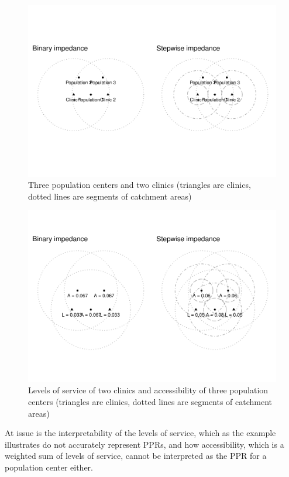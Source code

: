 \documentclass[10pt,letterpaper]{article}
\begin{document}
\begin{figure}
\includegraphics[width=0.95\linewidth]{Supply_and_Demand_Inflation_in_FCA_Methods_v2.0_files/figure-latex/fig3-example-3-1} \caption{\label{fig:fig3-example-3}Three population centers and two clinics (triangles are clinics, dotted lines are segments of catchment areas)}\label{fig:fig3-example-3}
\end{figure}

\begin{figure}
\includegraphics[width=0.95\linewidth]{Supply_and_Demand_Inflation_in_FCA_Methods_v2.0_files/figure-latex/fig4-example-4-1} \caption{\label{fig:fig4-example-4}Levels of service of two clinics and accessibility of three population centers (triangles are clinics, dotted lines are segments of catchment areas)}\label{fig:fig4-example-4}
\end{figure}

At issue is the interpretability of the levels of service, which as the
example illustrates do not accurately represent PPRs, and how
accessibility, which is a weighted sum of levels of service, cannot be
interpreted as the PPR for a population center either.
\end{document}
